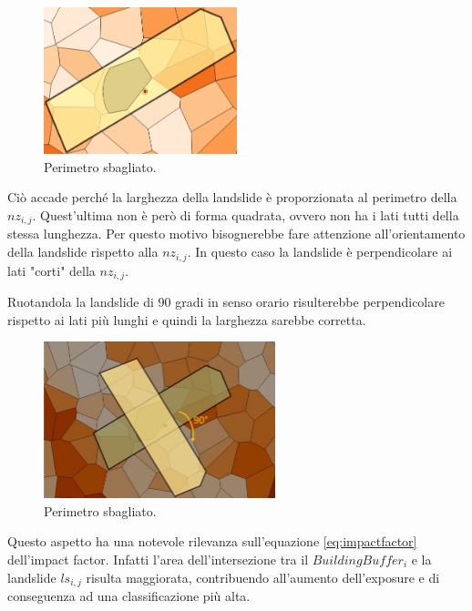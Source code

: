 \begin{figure}[h]
	\centering
	\includegraphics[width=0.5\textwidth]{images/WrongPerimeter}
	\caption{Perimetro sbagliato.}
	\label{wrongperimeter}
\end{figure}

Ciò accade perché la larghezza della landslide è proporzionata al perimetro della $nz_{i,j}$. Quest'ultima non è però di forma quadrata, ovvero non ha i lati tutti della stessa lunghezza. Per questo motivo bisognerebbe fare attenzione all'orientamento della landslide rispetto alla $nz_{i,j}$. In questo caso la landslide è  perpendicolare ai lati "corti" della $nz_{i,j}$. 

Ruotandola la landslide di 90 gradi in senso orario risulterebbe perpendicolare rispetto ai lati più lunghi e quindi la larghezza sarebbe corretta.

\begin{figure}[h]
	\centering
	\includegraphics[width=0.6\textwidth]{images/LandslideRotation}
	\caption{Perimetro sbagliato.}
	\label{landsliderotation}
\end{figure}


Questo aspetto ha una notevole rilevanza sull'equazione \ref{eq:impactfactor} dell'impact factor. Infatti l'area dell'intersezione tra il $BuildingBuffer_i$ e la landslide $ls_{i,j}$ risulta maggiorata, contribuendo all'aumento dell'exposure e di conseguenza ad una classificazione più alta.



